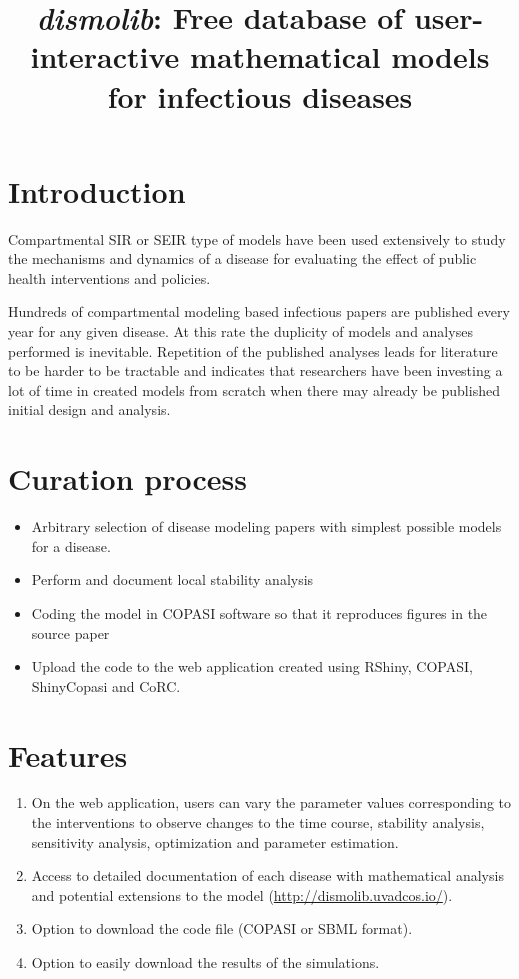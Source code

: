 \documentclass{article}
\title{\textit{dismolib}: Free database of user-interactive mathematical models for infectious diseases}
\author{}
\date{}
\begin{document}
\maketitle

\section{Introduction}
Compartmental SIR or SEIR type of models have been used extensively to study the mechanisms and dynamics of a disease for evaluating the effect of public health interventions and policies. 

Hundreds of compartmental modeling based infectious papers are published every year for any given disease. At this rate the duplicity of models and analyses performed is inevitable. Repetition of the published analyses leads for literature to be harder to be tractable and indicates that researchers have been investing a lot of time in created models from scratch when there may already be published initial design and analysis.




\section{Curation process}
\begin{itemize}
    \item Arbitrary selection of disease modeling papers with simplest possible models for a disease.
    \item Perform and document local stability analysis
    \item Coding the model in COPASI software so that it reproduces figures in the source paper
    \item Upload the code to the web application created using RShiny, COPASI, ShinyCopasi and CoRC.
\end{itemize}


\section{Features}
\begin{enumerate}
    \item On the web application, users can vary the parameter values corresponding to the interventions to observe changes to the time course, stability analysis, sensitivity analysis, optimization and parameter estimation.
    \item Access to detailed documentation of each disease with mathematical analysis and potential extensions to the model (\url{http://dismolib.uvadcos.io/}).
    \item Option to download the code file (COPASI or SBML format).
    \item Option to easily download the results of the simulations.
\end{enumerate}
\end{document}
